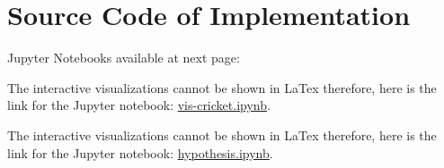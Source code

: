 \documentclass[fleqn,10pt]{wlscirep}
\begin{document}
\section{Source Code of Implementation}
Jupyter Notebooks available at next page:


The interactive visualizations cannot be shown in LaTex therefore, here is the link for the Jupyter notebook: \href{https://nbviewer.jupyter.org/github/dev-SB/cricket-bi/blob/master/vis-cricket.ipynb}{vis-cricket.ipynb}.

The interactive visualizations cannot be shown in LaTex therefore, here is the link for the Jupyter notebook: \href{https://nbviewer.jupyter.org/github/dev-SB/cricket-bi/blob/master/hypothesis.ipynb}{hypothesis.ipynb}.

\end{document}
